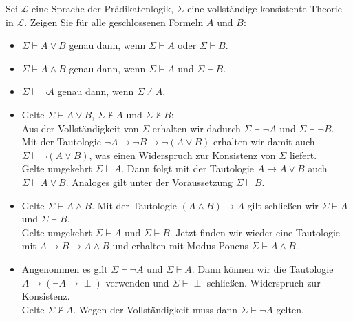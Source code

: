 
\begin{exercise}[113]

Sei $\mathscr{L}$ eine Sprache der Prädikatenlogik, $\Sigma$ eine vollständige
konsistente Theorie in $\mathscr{L}$. Zeigen Sie für alle geschlossenen Formeln
$A$ und $B$:
\begin{itemize}
  \item $\Sigma \vdash A \lor B$ genau dann, wenn $\Sigma \vdash A$ oder $\Sigma \vdash B$.
  \item $\Sigma \vdash A \land B$ genau dann, wenn $\Sigma \vdash A$ und $\Sigma \vdash B$.
  \item $\Sigma \vdash \neg A$ genau dann, wenn $\Sigma \nvdash A$.
\end{itemize}
\end{exercise}


\begin{solution}

\phantom{}
\begin{itemize}
  \item Gelte $\Sigma \vdash A \lor B$, $\Sigma \nvdash A$ und $\Sigma \nvdash B$:\\
  Aus der Vollständigkeit von $\Sigma$ erhalten wir dadurch $\Sigma \vdash \neg A$
  und $\Sigma \vdash \neg B$. Mit der Tautologie $\neg A \rightarrow \neg B \rightarrow \neg(A \lor B)$
  erhalten wir damit auch
  $\Sigma \vdash \neg(A \lor B)$, was einen Widerspruch zur Konsistenz von $\Sigma$ liefert. \\
  Gelte umgekehrt $\Sigma \vdash A$. Dann folgt mit der Tautologie $A \rightarrow A \lor B$
  auch $\Sigma \vdash A \lor B$. Analoges gilt unter der Voraussetzung $\Sigma \vdash B$.
  \item Gelte $\Sigma \vdash A \land B$. Mit der Tautologie $(A \land B) \rightarrow A$ gilt schließen wir $\Sigma \vdash A$ und $\Sigma \vdash B$. \\
  Gelte umgekehrt $\Sigma \vdash A $ und $\Sigma \vdash B$. Jetzt finden wir wieder
  eine Tautologie mit $A \rightarrow B \rightarrow A \land B$ und erhalten mit
  Modus Ponens $\Sigma \vdash A \land B$.
  \item Angenommen es gilt $\Sigma \vdash \neg A$ und $\Sigma \vdash A$. Dann können wir die Tautologie $A \rightarrow (\neg A \rightarrow \perp)$ verwenden und $\Sigma \vdash \perp$ schließen. Widerspruch zur Konsistenz. \\
  Gelte $\Sigma \nvdash A$. Wegen der Vollständigkeit muss dann $\Sigma \vdash \neg A$ gelten. 
\end{itemize}

\end{solution}

